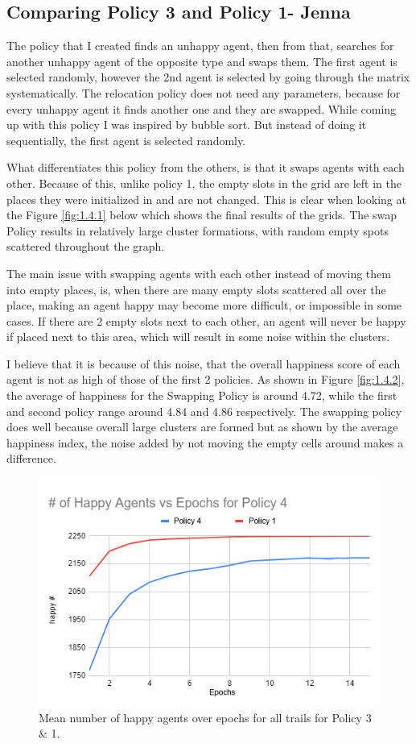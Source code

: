 \documentclass[a4paper,12pt]{article}
\begin{document}
  \newpage
  \subsection{Comparing Policy 3 and Policy 1- Jenna}
  The policy that I created finds an unhappy agent, then from that, searches for another unhappy agent of the opposite type and swaps them. The first agent is selected randomly, however the 2nd agent is selected by going through the matrix systematically. The relocation policy does not need any parameters, because for every unhappy agent it finds another one and they are swapped. While coming up with this policy I was inspired by bubble sort. But instead of doing it sequentially, the first agent is selected randomly.

  What differentiates this policy from the others, is that it swaps agents with each other. Because of this, unlike policy 1, the empty slots in the grid are left in the places they were initialized in and are not changed. This is clear when looking at the Figure \ref{fig:1.4.1} below which shows the final results of the grids. The swap Policy results in relatively large cluster formations, with random empty spots scattered throughout the graph.

  The main issue with swapping agents with each other instead of moving them into empty places, is, when there are many empty slots scattered all over the place, making an agent happy may become more difficult, or impossible in some cases. If there are 2 empty slots next to each other, an agent will never be happy if placed next to this area, which will result in some noise within the clusters.

  I believe that it is because of this noise, that the overall happiness score of each agent is not as high of those of the first 2 policies. As shown in Figure \ref{fig:1.4.2}, the average of happiness for the Swapping Policy is around 4.72, while the first and second policy range around 4.84 and 4.86 respectively. The swapping policy does well because overall large clusters are formed but as shown by the average happiness index, the noise added by not moving the empty cells around makes a difference.

  \begin{figure}[ht]
    \centering
    \includegraphics[width=0.5\linewidth]{policy4HappinessVEpochs.PNG}
    \caption{Mean number of happy agents over epochs for all trails for Policy 3 \& 1.}
    \label{fig:1.3}
  \end{figure}
\end{document}
